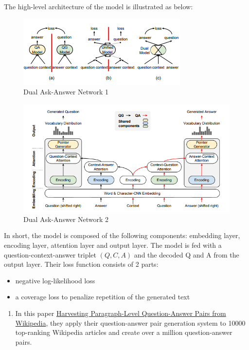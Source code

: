 \documentclass[]{book}
\providecommand{\tightlist}{%
  \setlength{\itemsep}{0pt}\setlength{\parskip}{0pt}}
\theoremstyle{definition}
\theoremstyle{definition}
\theoremstyle{definition}
\theoremstyle{remark}
\begin{document}
The high-level architecture of the model is illustrated as below:

\begin{figure}
\centering
\includegraphics{img/qgqa.png}
\caption{Dual Ask-Answer Network 1}
\end{figure}

\begin{figure}
\centering
\includegraphics{img/daan.png}
\caption{Dual Ask-Answer Network 2}
\end{figure}

In short, the model is composed of the following components: embedding
layer, encoding layer, attention layer and output layer. The model is
fed with a question-context-answer triplet \((Q,C,A)\) and the decoded Q
and A from the output layer. Their loss function consists of 2 parts:

\begin{itemize}
\tightlist
\item
  negative log-likelihood loss
\item
  a coverage loss to penalize repetition of the generated text
\end{itemize}

\begin{enumerate}
\def\labelenumi{\arabic{enumi}.}
\setcounter{enumi}{1}
\tightlist
\item
  In this paper \href{https://arxiv.org/pdf/1805.05942.pdf}{Harvesting
  Paragraph-Level Question-Answer Pairs from Wikipedia}, they apply
  their question-answer pair generation system to 10000 top-ranking
  Wikipedia articles and create over a million question-answer pairs.
\end{enumerate}
\end{document}

